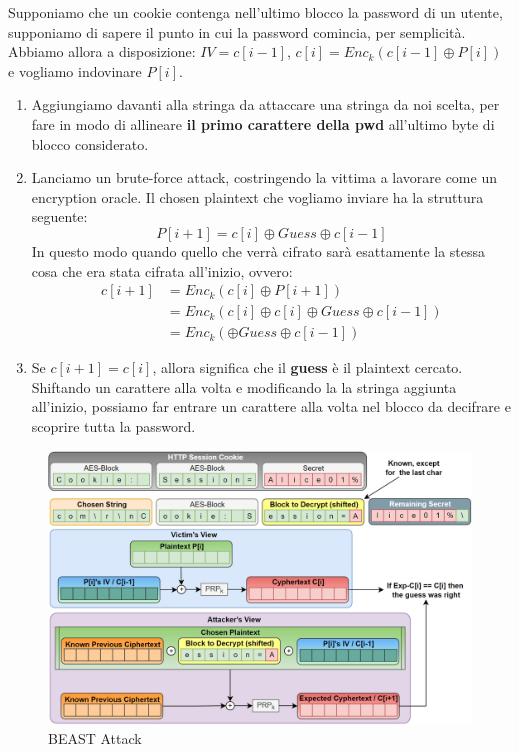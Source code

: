 \begin{definition}\label{def:beastatk}
Supponiamo che un cookie contenga nell'ultimo blocco la password di un utente, supponiamo di sapere il punto in cui la password comincia, per semplicità\footnotemark. Abbiamo allora a disposizione: $IV=c[i-1]$, $c[i]=Enc_k(c[i-1]\oplus{P[i]})$ e vogliamo indovinare $P[i]$.
\begin{enumerate}
    \item Aggiungiamo davanti alla stringa da attaccare una stringa da noi scelta, per fare in modo di allineare \textbf{il primo carattere della pwd} all'ultimo byte di blocco considerato.
    \item Lanciamo un brute-force attack, costringendo la vittima a lavorare come un encryption oracle. Il chosen plaintext che vogliamo inviare ha la struttura seguente:
    \begin{equation}\label{eq:beastcpa}
        P[i+1] = c[i]\oplus{Guess}\oplus{c[i-1]}
    \end{equation}
    In questo modo quando quello che verrà cifrato sarà esattamente la stessa cosa che era stata cifrata all'inizio, ovvero: 
    \begin{equation}
    \begin{aligned}
        c[i+1]&=Enc_k(c[i]\oplus{P[i+1]})\\
        &=Enc_k(c[i]\oplus{c[i]\oplus{Guess}\oplus{c[i-1]}})\\
        &=Enc_k(\oplus{Guess}\oplus{c[i-1]})
    \end{aligned}
\end{equation}
    \item Se $c[i+1]=c[i]$, allora significa che il \textbf{guess} è il plaintext cercato. Shiftando un carattere alla volta e modificando la la stringa aggiunta all'inizio, possiamo far entrare un carattere alla volta nel blocco da decifrare e scoprire tutta la password.
\end{enumerate}
\end{definition}
\begin{figure}[h]
    \centering
    \includegraphics[width=\linewidth]{image/beast.png}
    \caption{BEAST Attack}
    \label{fig:beast}
\end{figure}
